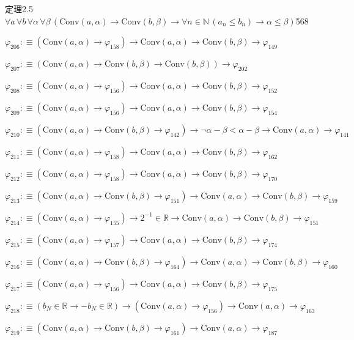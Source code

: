 \begin{fullproof}{定理2.5}{$\forall a\,\forall b\,\forall \alpha\,\forall \beta\,(\mathrm{Conv}(a,\alpha) \to \mathrm{Conv}(b,\beta) \to \forall n \in \mathbb{N}\,(a_{n} \leq b_{n}) \to \alpha \leq \beta)$}{568}
\begin{abbrevlist}
\item $\varphi_{206} :\equiv (\mathrm{Conv}(a,\alpha) \to \varphi_{158}) \to \mathrm{Conv}(a,\alpha) \to \mathrm{Conv}(b,\beta) \to \varphi_{149}$
\item $\varphi_{207} :\equiv (\mathrm{Conv}(a,\alpha) \to \mathrm{Conv}(b,\beta) \to \mathrm{Conv}(b,\beta)) \to \varphi_{202}$
\item $\varphi_{208} :\equiv (\mathrm{Conv}(a,\alpha) \to \varphi_{156}) \to \mathrm{Conv}(a,\alpha) \to \mathrm{Conv}(b,\beta) \to \varphi_{152}$
\item $\varphi_{209} :\equiv (\mathrm{Conv}(a,\alpha) \to \varphi_{156}) \to \mathrm{Conv}(a,\alpha) \to \mathrm{Conv}(b,\beta) \to \varphi_{154}$
\item $\varphi_{210} :\equiv (\mathrm{Conv}(a,\alpha) \to \mathrm{Conv}(b,\beta) \to \varphi_{142}) \to \neg \alpha - \beta < \alpha - \beta \to \mathrm{Conv}(a,\alpha) \to \varphi_{141}$
\item $\varphi_{211} :\equiv (\mathrm{Conv}(a,\alpha) \to \varphi_{158}) \to \mathrm{Conv}(a,\alpha) \to \mathrm{Conv}(b,\beta) \to \varphi_{162}$
\item $\varphi_{212} :\equiv (\mathrm{Conv}(a,\alpha) \to \varphi_{158}) \to \mathrm{Conv}(a,\alpha) \to \mathrm{Conv}(b,\beta) \to \varphi_{170}$
\item $\varphi_{213} :\equiv (\mathrm{Conv}(a,\alpha) \to \mathrm{Conv}(b,\beta) \to \varphi_{151}) \to \mathrm{Conv}(a,\alpha) \to \mathrm{Conv}(b,\beta) \to \varphi_{159}$
\item $\varphi_{214} :\equiv (\mathrm{Conv}(a,\alpha) \to \varphi_{155}) \to 2^{-1} \in \mathbb{R} \to \mathrm{Conv}(a,\alpha) \to \mathrm{Conv}(b,\beta) \to \varphi_{151}$
\item $\varphi_{215} :\equiv (\mathrm{Conv}(a,\alpha) \to \varphi_{157}) \to \mathrm{Conv}(a,\alpha) \to \mathrm{Conv}(b,\beta) \to \varphi_{174}$
\item $\varphi_{216} :\equiv (\mathrm{Conv}(a,\alpha) \to \mathrm{Conv}(b,\beta) \to \varphi_{164}) \to \mathrm{Conv}(a,\alpha) \to \mathrm{Conv}(b,\beta) \to \varphi_{160}$
\item $\varphi_{217} :\equiv (\mathrm{Conv}(a,\alpha) \to \varphi_{156}) \to \mathrm{Conv}(a,\alpha) \to \mathrm{Conv}(b,\beta) \to \varphi_{175}$
\item $\varphi_{218} :\equiv (b_{N} \in \mathbb{R} \to -b_{N} \in \mathbb{R}) \to (\mathrm{Conv}(a,\alpha) \to \varphi_{156}) \to \mathrm{Conv}(a,\alpha) \to \varphi_{163}$
\item $\varphi_{219} :\equiv (\mathrm{Conv}(a,\alpha) \to \mathrm{Conv}(b,\beta) \to \varphi_{161}) \to \mathrm{Conv}(a,\alpha) \to \varphi_{187}$

\end{abbrevlist}
\end{fullproof}
